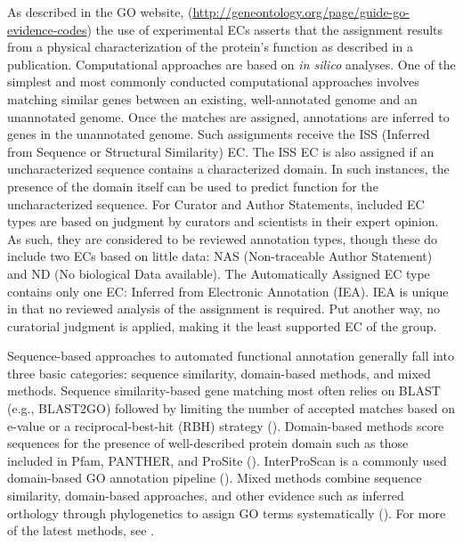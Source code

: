 As described in the GO website, (\href{http://geneontology.org/page/guide-go-evidence-codes}{http://geneontology.org/page/guide-go-evidence-codes}) the use of experimental ECs asserts that the assignment results from a physical characterization of the protein's function as described in a publication. Computational approaches are based on \textit{in silico} analyses. One of the simplest and most commonly conducted computational approaches involves matching similar genes between an existing, well-annotated genome and an unannotated genome. Once the matches are assigned, annotations are inferred to genes in the unannotated genome. Such assignments receive the ISS (Inferred from Sequence or Structural Similarity) EC. The ISS EC is also assigned if an uncharacterized sequence contains a characterized domain. In such instances, the presence of the domain itself can be used to predict function for the uncharacterized sequence. For Curator and Author Statements, included EC types are based on judgment by curators and scientists in their expert opinion. As such, they are considered to be reviewed annotation types, though these do include two ECs based on little data: NAS (Non-traceable Author Statement) and ND (No biological Data available). The Automatically Assigned EC type contains only one EC: Inferred from Electronic Annotation (IEA). IEA is unique in that no reviewed analysis of the assignment is required.  Put another way, no curatorial judgment is applied, making it the least supported EC of the group.

Sequence-based approaches to automated functional annotation generally fall into three basic categories: sequence similarity, domain-based methods, and mixed methods. Sequence similarity-based gene matching most often relies on BLAST (e.g., BLAST2GO) followed by limiting the number of accepted matches based on e-value or a reciprocal-best-hit (RBH) strategy  (\cite{conesa_2008-pG, altschul_1990-O4, morenohagelsieb_2008-28}). Domain-based methods score sequences for the presence of well-described protein domain such as those included in Pfam, PANTHER, and ProSite (\cite{finn_2017-cC}). InterProScan is a commonly used domain-based GO annotation pipeline (\cite{jones_2014-tn}). Mixed methods combine sequence similarity, domain-based approaches, and other evidence such as inferred orthology through phylogenetics to assign GO terms systematically (\cite{koskinen_2015-sl, clark_2011--Z,falda_2012-VX}). For more of the latest methods, see \cite{jiang_2016-be}.

